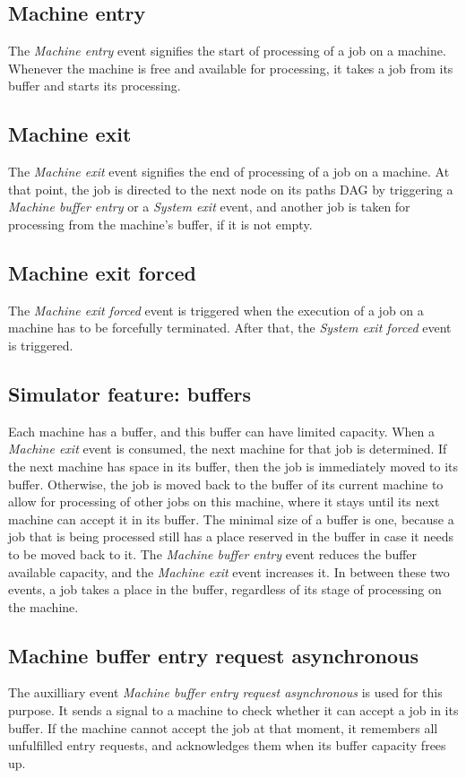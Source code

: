 \subsection{Machine entry}
The \textit{Machine entry} event signifies the start of processing of a job on a machine. Whenever the machine is free and available for processing, it takes a job from its buffer and starts its processing.

\subsection{Machine exit}
The \textit{Machine exit} event signifies the end of processing of a job on a machine. At that point, the job is directed to the next node on its paths DAG by triggering a \textit{Machine buffer entry} or a \textit{System exit} event, and another job is taken for processing from the machine's buffer, if it is not empty.

\subsection{Machine exit forced}
The \textit{Machine exit forced} event is triggered when the execution of a job on a machine has to be forcefully terminated. After that, the \textit{System exit forced} event is triggered.

\subsection{Simulator feature: buffers}
Each machine has a buffer, and this buffer can have limited capacity. When a \textit{Machine exit} event is consumed, the next machine for that job is determined. If the next machine has space in its buffer, then the job is immediately moved to its buffer. Otherwise, the job is moved back to the buffer of its current machine to allow for processing of other jobs on this machine, where it stays until its next machine can accept it in its buffer. The minimal size of a buffer is one, because a job that is being processed still has a place reserved in the buffer in case it needs to be moved back to it. The \textit{Machine buffer entry} event reduces the buffer available capacity, and the \textit{Machine exit} event increases it. In between these two events, a job takes a place in the buffer, regardless of its stage of processing on the machine. 

\subsection{Machine buffer entry request asynchronous}
The auxilliary event \textit{Machine buffer entry request asynchronous} is used for this purpose. It sends a signal to a machine to check whether it can accept a job in its buffer. If the machine cannot accept the job at that moment, it remembers all unfulfilled entry requests, and acknowledges them when its buffer capacity frees up.

